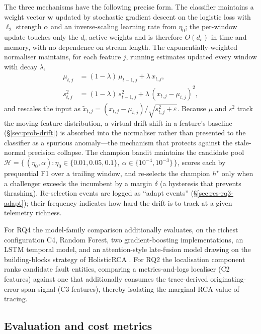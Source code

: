 \documentclass[pdflatex,sn-mathphys-num]{sn-jnl}%
\theoremstyle{thmstyleone}%
\theoremstyle{thmstyletwo}%
\theoremstyle{thmstylethree}%
\begin{document}
The three mechanisms have the following precise form. The classifier maintains a weight vector $\mathbf{w}$ updated by stochastic gradient descent on the logistic loss with $\ell_2$ strength $\alpha$ and an inverse-scaling learning rate from $\eta_0$; the per-window update touches only the $d_c$ active weights and is therefore $O(d_c)$ in time and memory, with no dependence on stream length. The exponentially-weighted normaliser maintains, for each feature $j$, running estimates updated every window with decay $\lambda$,
\begin{align}
  \mu_{t,j} &= (1-\lambda)\,\mu_{t-1,j} + \lambda\, x_{t,j}, \\
  s^2_{t,j} &= (1-\lambda)\,s^2_{t-1,j} + \lambda\,(x_{t,j}-\mu_{t,j})^2,
\end{align}
and rescales the input as $\tilde{x}_{t,j} = (x_{t,j}-\mu_{t,j})/\sqrt{s^2_{t,j}+\varepsilon}$. Because $\mu$ and $s^2$ track the moving feature distribution, a virtual-drift shift in a feature's baseline (\S\ref{sec:prob-drift}) is absorbed into the normaliser rather than presented to the classifier as a spurious anomaly---the mechanism that protects against the stale-normal precision collapse. The champion bandit maintains the candidate pool $\mathcal{H} = \{\,(\eta_0,\alpha) : \eta_0 \in \{0.01,0.05,0.1\},\ \alpha \in \{10^{-4},10^{-3}\}\,\}$, scores each by prequential F1 over a trailing window, and re-selects the champion $h^\star$ only when a challenger exceeds the incumbent by a margin $\delta$ (a hysteresis that prevents thrashing). Re-selection events are logged as ``adapt events'' (\S\ref{sec:res-rq3-adapt}); their frequency indicates how hard the drift is to track at a given telemetry richness.

For RQ4 the model-family comparison additionally evaluates, on the richest configuration C4, Random Forest, two gradient-boosting implementations, an LSTM temporal model, and an attention-style late-fusion model drawing on the building-blocks strategy of HolisticRCA \cite{han2024}. For RQ2 the localisation component ranks candidate fault entities, comparing a metrics-and-logs localiser (C2 features) against one that additionally consumes the trace-derived originating-error-span signal (C3 features), thereby isolating the marginal RCA value of tracing.

\subsection{Evaluation and cost metrics}\label{sec:method-metrics}
\end{document}
